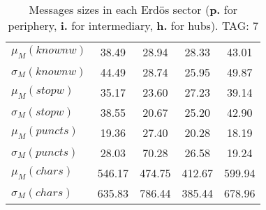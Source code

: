 \begin{table}[h!]
\begin{center}
\begin{tabular}{| l || c | c | c | c |}
$\mu_M(knownw)$ & 38.49  & 28.94  & 28.33  & 43.01 \\
$\sigma_M(knownw)$ & 44.49  & 28.74  & 25.95  & 49.87 \\\hline
$\mu_M(stopw)$ & 35.17  & 23.60  & 27.23  & 39.14 \\
$\sigma_M(stopw)$ & 38.55  & 20.67  & 25.20  & 42.90 \\\hline
$\mu_M(puncts)$ & 19.36  & 27.40  & 20.28  & 18.19 \\
$\sigma_M(puncts)$ & 28.03  & 70.28  & 26.58  & 19.24 \\\hline
$\mu_M(chars)$ & 546.17  & 474.75  & 412.67  & 599.94 \\
$\sigma_M(chars)$ & 635.83  & 786.44  & 385.44  & 678.96 \\\hline
\end{tabular}
\caption{Messages sizes in each Erd\"os sector ({{\bf p.}} for periphery, {{\bf i.}} for intermediary, {{\bf h.}} for hubs). TAG: 7}
\end{center}
\end{table}